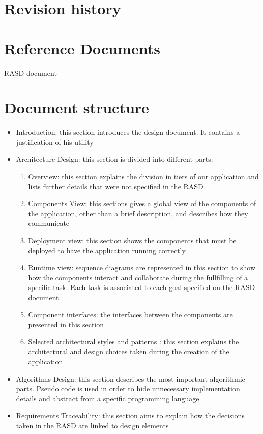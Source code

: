 
\section{Revision history}

\section{Reference Documents}
RASD document

\section{Document structure}
\begin{itemize}
\item Introduction: this section introduces the design document. It contains a justification of his utility
\item Architecture Design: this section is divided into different parts:
\begin{enumerate}
\item Overview: this section explains the division in tiers of our application and lists further details that were not specified in the RASD.
\item Components View: this sections gives a global view of the components of the application, other than a brief description, and describes how they communicate
\item Deployment view: this section shows the components that must be deployed to have the application running correctly
\item Runtime view: sequence diagrams are represented in this section to show how the components interact and collaborate during the fullfilling of a specific task. Each task is associated to each goal specified on the RASD document
\item Component interfaces: the interfaces between the components are presented in this section
\item Selected architectural styles and patterns : this section explains the architectural and design choices taken during the creation of the application
\end{enumerate}
\item Algorithms Design: this section describes the most important algorithmic parts. Pseudo code is used in order to hide unnecessary implementation details and abstract from a specific programming language
\item Requirements Traceability: this section aims to explain how the decisions taken in the RASD are linked to design elements
\end{itemize}



 

